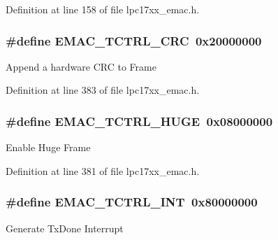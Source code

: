 \-Definition at line 158 of file lpc17xx\-\_\-emac.\-h.

\hypertarget{group___e_m_a_c___private___macros_ga6a2a8f19c7f98f69ca529b0fd5fd04ea}{
\subsubsection[{\-E\-M\-A\-C\-\_\-\-T\-C\-T\-R\-L\-\_\-\-C\-R\-C}]{\setlength{\rightskip}{0pt plus 5cm}\#define {\bf \-E\-M\-A\-C\-\_\-\-T\-C\-T\-R\-L\-\_\-\-C\-R\-C}~0x20000000}}\label{group___e_m_a_c___private___macros_ga6a2a8f19c7f98f69ca529b0fd5fd04ea}
\-Append a hardware \-C\-R\-C to \-Frame 

\-Definition at line 383 of file lpc17xx\-\_\-emac.\-h.

\hypertarget{group___e_m_a_c___private___macros_ga79b6cb57bc8706461714d3b7cb29588d}{
\subsubsection[{\-E\-M\-A\-C\-\_\-\-T\-C\-T\-R\-L\-\_\-\-H\-U\-G\-E}]{\setlength{\rightskip}{0pt plus 5cm}\#define {\bf \-E\-M\-A\-C\-\_\-\-T\-C\-T\-R\-L\-\_\-\-H\-U\-G\-E}~0x08000000}}\label{group___e_m_a_c___private___macros_ga79b6cb57bc8706461714d3b7cb29588d}
\-Enable \-Huge \-Frame 

\-Definition at line 381 of file lpc17xx\-\_\-emac.\-h.

\hypertarget{group___e_m_a_c___private___macros_ga75fdd56cd6e79e142a18793ad139c150}{
\subsubsection[{\-E\-M\-A\-C\-\_\-\-T\-C\-T\-R\-L\-\_\-\-I\-N\-T}]{\setlength{\rightskip}{0pt plus 5cm}\#define {\bf \-E\-M\-A\-C\-\_\-\-T\-C\-T\-R\-L\-\_\-\-I\-N\-T}~0x80000000}}\label{group___e_m_a_c___private___macros_ga75fdd56cd6e79e142a18793ad139c150}
\-Generate \-Tx\-Done \-Interrupt 

